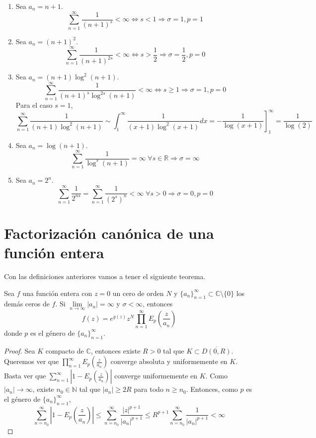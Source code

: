 \begin{example}
    \hfill
    \begin{enumerate}
        \item Sea $a_n = n+1$.
              $$\sum_{n=1}^\infty \frac{1}{(n+1)^s} < \infty \Leftrightarrow s < 1 \Rightarrow \sigma = 1, p = 1$$
        \item Sea $a_n = (n+1)^2$.
              $$\sum_{n=1}^\infty \frac{1}{(n+1)^{2s}} < \infty \Leftrightarrow s > \frac{1}{2} \Rightarrow \sigma = \frac{1}{2}, p = 0$$
        \item Sea $a_n = (n+1)\log^2(n+1)$.
              $$\sum_{n=1}^\infty \frac{1}{(n+1)^s\log^{2s}(n+1)} < \infty \Leftrightarrow s \geq 1 \Rightarrow \sigma = 1, p = 0$$
              Para el caso $s = 1$,
              $$\sum_{n=1}^\infty \frac{1}{(n+1)\log^2(n+1)} \sim \int_1^\infty \frac{1}{(x+1)\log^2(x+1)}dx = \left.-\frac{1}{\log(x+1)}\right]_1^\infty = \frac{1}{\log(2)}$$
        \item Sea $a_n = \log(n+1)$.
              $$\sum_{n=1}^\infty \frac{1}{\log^s(n+1)} = \infty \; \forall s \in \mathbb{R} \Rightarrow \sigma = \infty$$
        \item Sea $a_n = 2^n$.
              $$\sum_{n=1}^\infty \frac{1}{2^{ns}} = \sum_{n=1}^\infty \frac{1}{(2^s)^n} < \infty \; \forall s > 0 \Rightarrow \sigma = 0, p = 0$$
    \end{enumerate}
\end{example}

\section{Factorización canónica de una función entera}
Con las definiciones anteriores vamos a tener el siguiente teorema.

\begin{theorem}
    Sea $f$ una función entera con $z = 0$ un cero de orden $N$ y $\{a_n\}_{n=1}^\infty \subset \mathbb{C} \setminus \{0\}$ los demás ceros de $f$.
    Si $\lim\limits_{n \to \infty} |a_n| = \infty$ y $\sigma < \infty$, entonces
    $$f(z) = e^{g(z)}z^N\prod_{n=1}^\infty E_p\left(\frac{z}{a_n}\right)$$
    donde $p$ es el género de $\{a_n\}_{n=1}^\infty$.
\end{theorem}

\begin{proof}
    Sea $K$ compacto de $\mathbb{C}$, entonces existe $R > 0$ tal que $K \subset \overline{D(0, R)}$.
    Queremos ver que $\prod_{n=1}^\infty E_p\left(\frac{z}{a_n}\right)$ converge absoluta y uniformemente en $K$.
    Basta ver que $\sum_{n=1}^\infty \left|1-E_p\left(\frac{z}{a_n}\right)\right|$ converge uniformemente en $K$.
    Como $|a_n| \to \infty$, existe $n_0 \in \mathbb{N}$ tal que $|a_n| \geq 2R$ para todo $n \geq n_0$.
    Entonces, como $p$ es el género de $\{a_n\}_{n=1}^\infty$,
    $$\sum_{n=n_0}^\infty \left|1-E_p\left(\frac{z}{a_n}\right)\right| \leq \sum_{n=n_0}^\infty \frac{|z|^{p+1}}{|a_n|^{p+1}} \leq R^{p+1} \sum_{n=n_0}^\infty \frac{1}{|a_n|^{p+1}} < \infty$$
\end{proof}


